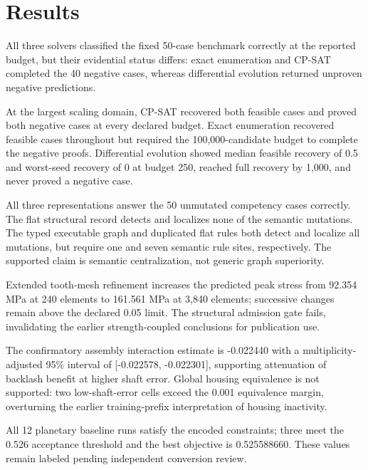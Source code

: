 \documentclass[preprint,12pt]{elsarticle}
\begin{document}
\section{Results}
All three solvers classified the fixed 50-case benchmark correctly at the reported budget, but their evidential status differs: exact enumeration and CP-SAT completed the 40 negative cases, whereas differential evolution returned unproven negative predictions.

At the largest scaling domain, CP-SAT recovered both feasible cases and proved both negative cases at every declared budget. Exact enumeration recovered feasible cases throughout but required the 100,000-candidate budget to complete the negative proofs. Differential evolution showed median feasible recovery of 0.5 and worst-seed recovery of 0 at budget 250, reached full recovery by 1,000, and never proved a negative case.

All three representations answer the 50 unmutated competency cases correctly. The flat structural record detects and localizes none of the semantic mutations. The typed executable graph and duplicated flat rules both detect and localize all mutations, but require one and seven semantic rule sites, respectively. The supported claim is semantic centralization, not generic graph superiority.

Extended tooth-mesh refinement increases the predicted peak stress from 92.354 MPa at 240 elements to 161.561 MPa at 3,840 elements; successive changes remain above the declared 0.05 limit. The structural admission gate fails, invalidating the earlier strength-coupled conclusions for publication use.

The confirmatory assembly interaction estimate is -0.022440 with a multiplicity-adjusted 95\% interval of [-0.022578, -0.022301], supporting attenuation of backlash benefit at higher shaft error. Global housing equivalence is not supported: two low-shaft-error cells exceed the 0.001 equivalence margin, overturning the earlier training-prefix interpretation of housing inactivity.

All 12 planetary baseline runs satisfy the encoded constraints; three meet the 0.526 acceptance threshold and the best objective is 0.525588660. These values remain labeled pending independent conversion review.
\end{document}
